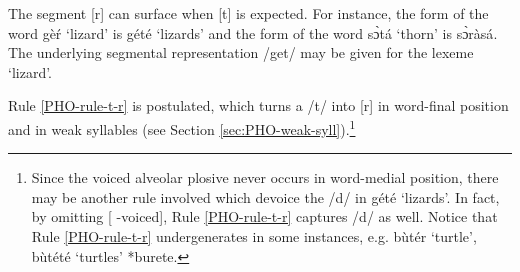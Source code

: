  
\begin{table} 
\caption{Alveolar plosives \label{tab:alveolar-plosives}}

\quad
{}
\end{table}

The segment [{r}]  can surface when [{t}]  is expected.  For instance, 
the 
 form of the word {\sls gèŕ} `lizard' is {\sls gété} `lizards' and 
the 
 form of the word {\sls sɔ̀tá} `thorn'  is {\sls sɔ̀ràsá}. The 
underlying 
segmental representation /{get}/ may be given for the lexeme `lizard'. 




\newpage 
Rule \ref{PHO-rule-t-r} is postulated, which turns a /{t}/ into  [{r}] 
in word-final position and in weak syllables (see Section 
\ref{sec:PHO-weak-syll}).\footnote{Since the voiced  alveolar plosive never 
occurs in word-medial position, there may be another rule involved which devoice 
the /{d}/ in   {\sls gété} `lizards'. In fact, by omitting [{\sc 
-voiced}],  Rule \ref{PHO-rule-t-r} captures /{d}/  as well. Notice that  Rule  \ref{PHO-rule-t-r} undergenerates in some instances, e.g. {\sls bùtér} `turtle', {\sls bùtété} `turtles'  *{\sls burete}.}


